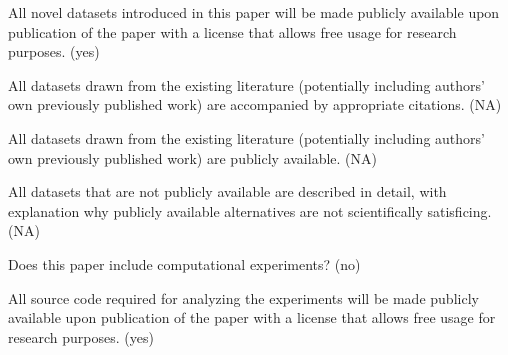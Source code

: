 \documentclass[letterpaper]{article} %
\begin{document}
    All novel datasets introduced in this paper will be made publicly available upon publication of the paper with a license that allows free usage for research purposes. (yes)

    All datasets drawn from the existing literature (potentially including authors’ own previously published work) are accompanied by appropriate citations. (NA)

    All datasets drawn from the existing literature (potentially including authors’ own previously published work) are publicly available. (NA)

    All datasets that are not publicly available are described in detail, with explanation why publicly available alternatives are not scientifically satisficing. (NA)


Does this paper include computational experiments? (no)

All source code required for analyzing the experiments will be made publicly available upon publication of the paper with a license that allows free usage for research purposes. (yes)



\end{document}
